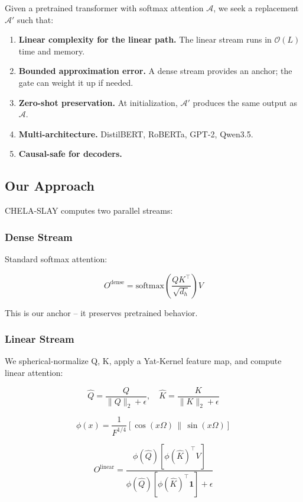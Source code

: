 Given a pretrained transformer with softmax attention $\mathcal{A}$, we seek 
a replacement $\mathcal{A}'$ such that:

\begin{enumerate}
\item \textbf{Linear complexity for the linear path.} The linear stream runs in
  $\mathcal{O}(L)$ time and memory.
\item \textbf{Bounded approximation error.} A dense stream provides an anchor; the
  gate can weight it up if needed.
\item \textbf{Zero-shot preservation.} At initialization, $\mathcal{A}'$ produces
  the same output as $\mathcal{A}$.
\item \textbf{Multi-architecture.} DistilBERT, RoBERTa, GPT-2, Qwen3.5.
\item \textbf{Causal-safe for decoders.}

\end{enumerate}
\subsection{Our Approach}

CHELA-SLAY computes two parallel streams:

\subsubsection{Dense Stream}

Standard softmax attention:

\[
O^\text{dense} = \text{softmax}\!\left(\frac{Q K^\top}{\sqrt{d_h}}\right) V
\]

This is our anchor -- it preserves pretrained behavior.

\subsubsection{Linear Stream}

We spherical-normalize Q, K, apply a Yat-Kernel feature map, and compute 
linear attention:

\[
\hat{Q} = \frac{Q}{\|Q\|_2 + \epsilon}, \quad
\hat{K} = \frac{K}{\|K\|_2 + \epsilon}
\]

\[
\phi(x) = \frac{1}{F^{1/4}} [\cos(x \Omega) \,\|\, \sin(x \Omega)]
\]

\[
O^\text{linear} = \frac{\phi(\hat{Q}) \left[ \phi(\hat{K})^\top V \right]}{\phi(\hat{Q}) \left[ \phi(\hat{K})^\top \mathbf{1} \right] + \epsilon}
\]

